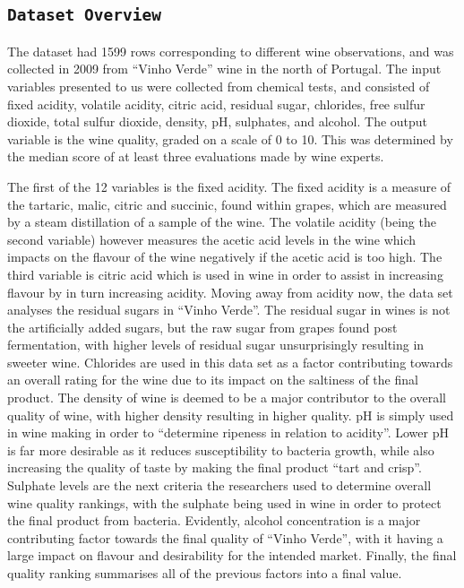 \documentclass[letterpaper,8pt,twocolumn,twoside,]{pinp}
\begin{document}
\hypertarget{dataset-overview}{%
\subsection{\texorpdfstring{\texttt{Dataset\ Overview}}{Dataset Overview}}\label{dataset-overview}}

The dataset had 1599 rows corresponding to different wine observations,
and was collected in 2009 from ``Vinho Verde'' wine in the north of
Portugal. The input variables presented to us were collected from
chemical tests, and consisted of fixed acidity, volatile acidity, citric
acid, residual sugar, chlorides, free sulfur dioxide, total sulfur
dioxide, density, pH, sulphates, and alcohol. The output variable is the
wine quality, graded on a scale of 0 to 10. This was determined by the
median score of at least three evaluations made by wine experts.

The first of the 12 variables is the fixed acidity. The fixed acidity is
a measure of the tartaric, malic, citric and succinic, found within
grapes, which are measured by a steam distillation of a sample of the
wine. The volatile acidity (being the second variable) however measures
the acetic acid levels in the wine which impacts on the flavour of the
wine negatively if the acetic acid is too high. The third variable is
citric acid which is used in wine in order to assist in increasing
flavour by in turn increasing acidity. Moving away from acidity now, the
data set analyses the residual sugars in ``Vinho Verde''. The residual
sugar in wines is not the artificially added sugars, but the raw sugar
from grapes found post fermentation, with higher levels of residual
sugar unsurprisingly resulting in sweeter wine. Chlorides are used in
this data set as a factor contributing towards an overall rating for the
wine due to its impact on the saltiness of the final product. The
density of wine is deemed to be a major contributor to the overall
quality of wine, with higher density resulting in higher quality. pH is
simply used in wine making in order to ``determine ripeness in relation
to acidity''. Lower pH is far more desirable as it reduces
susceptibility to bacteria growth, while also increasing the quality of
taste by making the final product ``tart and crisp''. Sulphate levels
are the next criteria the researchers used to determine overall wine
quality rankings, with the sulphate being used in wine in order to
protect the final product from bacteria. Evidently, alcohol
concentration is a major contributing factor towards the final quality
of ``Vinho Verde'', with it having a large impact on flavour and
desirability for the intended market. Finally, the final quality ranking
summarises all of the previous factors into a final value.
\end{document}
